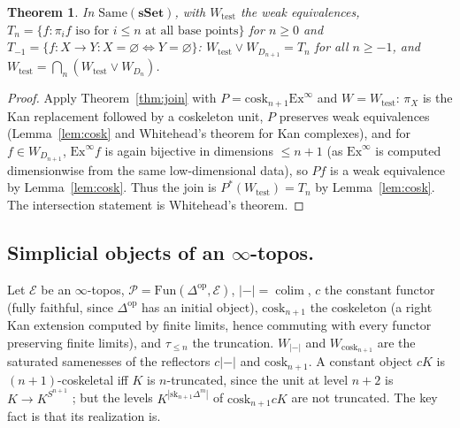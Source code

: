 \documentclass[11pt]{amsart}
\newtheorem{thm}{Theorem}[section]
\theoremstyle{definition}
\newcommand{\Same}{\mathrm{Same}}
\newcommand{\cosk}{\mathrm{cosk}}
\newcommand{\sk}{\mathrm{sk}}
\newcommand{\Fun}{\mathrm{Fun}}
\newcommand{\E}{\mathcal E}
\newcommand{\tr}[1]{\tau_{\le #1}}
\newcommand{\re}{|{-}|}
\newcommand{\Wtest}{W_{\mathrm{test}}}
\newcommand{\sset}{\mathbf{sSet}}
\begin{document}
\begin{thm}\label{thm:sset}
In $\Same(\sset)$, with $\Wtest$ the weak equivalences,
$T_n=\{f:\pi_if\text{ iso for }i\le n\text{ at all base points}\}$ for $n\ge0$ and
$T_{-1}=\{f\colon X\to Y: X=\varnothing\Leftrightarrow Y=\varnothing\}$:
$\Wtest\vee W_{D_{n+1}}=T_n$ for all $n\ge-1$, and $\Wtest=\bigcap_n(\Wtest\vee W_{D_n})$.
\end{thm}
\begin{proof}
Apply Theorem~\ref{thm:join} with $P=\cosk_{n+1}\mathrm{Ex}^\infty$ and
$W=\Wtest$: $\pi_X$ is the Kan replacement followed by a coskeleton unit,
$P$ preserves weak equivalences (Lemma~\ref{lem:cosk} and Whitehead's theorem
for Kan complexes), and for $f\in W_{D_{n+1}}$, $\mathrm{Ex}^\infty f$ is again
bijective in dimensions $\le n+1$ (as $\mathrm{Ex}^\infty$ is computed
dimensionwise from the same low-dimensional data), so $Pf$ is a weak equivalence
by Lemma~\ref{lem:cosk}. Thus the join is $P^*(\Wtest)=T_n$ by
Lemma~\ref{lem:cosk}. The intersection statement is Whitehead's theorem.
\end{proof}

\subsection{Simplicial objects of an $\infty$-topos.}
Let $\E$ be an $\infty$-topos, $\mathcal P=\Fun(\Delta^{\mathrm{op}},\E)$,
$\re=\operatorname{colim}$, $c$ the constant functor (fully faithful, since
$\Delta^{\mathrm{op}}$ has an initial object), $\cosk_{n+1}$ the coskeleton
(a right Kan extension computed by finite limits, hence commuting with every
functor preserving finite limits), and $\tr n$ the truncation. $W_{\re}$ and
$W_{\cosk_{n+1}}$ are the saturated samenesses of the reflectors $c\re$ and
$\cosk_{n+1}$. A constant object $cK$ is $(n{+}1)$-coskeletal iff $K$ is
$n$-truncated, since the unit at level $n+2$ is $K\to K^{S^{n+1}}$
\cite[Lemma~8.2]{Topjoin}; but the levels $K^{|\sk_{n+1}\Delta^m|}$ of
$\cosk_{n+1}cK$ are not truncated. The key fact is that its realization is.
\end{document}

